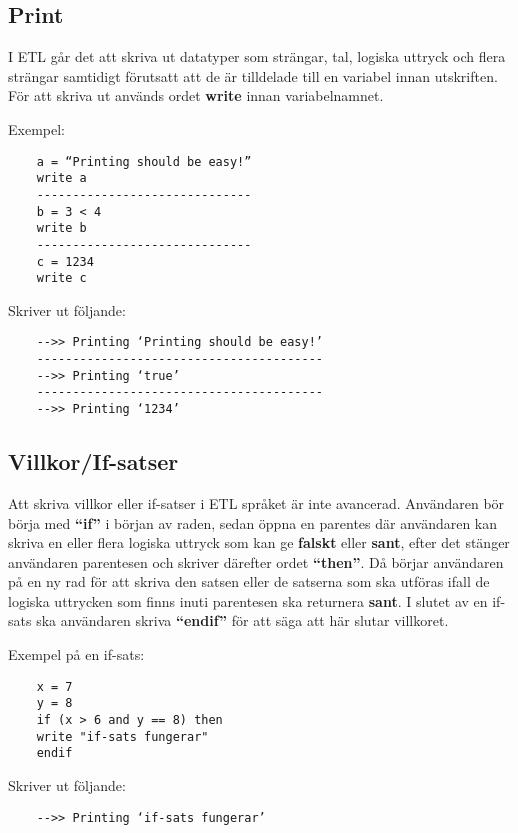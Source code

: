 \documentclass{TDP019mall}
\begin{document}
\subsection{Print}
I ETL går det att skriva ut datatyper som strängar, tal, logiska uttryck och flera strängar samtidigt förutsatt att de är tilldelade till en variabel innan utskriften. 
För att skriva ut används ordet \textbf{write} innan variabelnamnet. 

Exempel: 
 
\begin{verbatim}
    a = “Printing should be easy!”
    write a
    ------------------------------
    b = 3 < 4
    write b
    ------------------------------
    c = 1234
    write c
\end{verbatim}
 
Skriver ut följande:

\begin{verbatim}
    -->> Printing ‘Printing should be easy!’
    ----------------------------------------
    -->> Printing ‘true’
    ----------------------------------------
    -->> Printing ‘1234’   
\end{verbatim} 


\subsection{Villkor/If-satser}
Att skriva villkor eller if-satser i ETL språket är inte avancerad. Användaren bör börja med \textbf{“if”} i början av raden, 
sedan öppna en parentes där användaren kan skriva en eller flera logiska uttryck som kan ge \textbf{falskt} eller \textbf{sant}, efter det stänger 
användaren parentesen och skriver därefter ordet \textbf{“then”}. Då börjar användaren på en ny rad för att skriva den satsen eller de satserna 
som ska utföras ifall de logiska uttrycken som finns inuti parentesen ska returnera \textbf{sant}. I slutet av en if-sats ska 
användaren skriva \textbf{“endif”} för att säga att här slutar villkoret.
 
Exempel på en if-sats: 
 
\begin{verbatim}
    x = 7
    y = 8
    if (x > 6 and y == 8) then
    write "if-sats fungerar"
    endif
\end{verbatim}

Skriver ut följande:
\begin{verbatim}
    -->> Printing ‘if-sats fungerar’
\end{verbatim}
\end{document}
